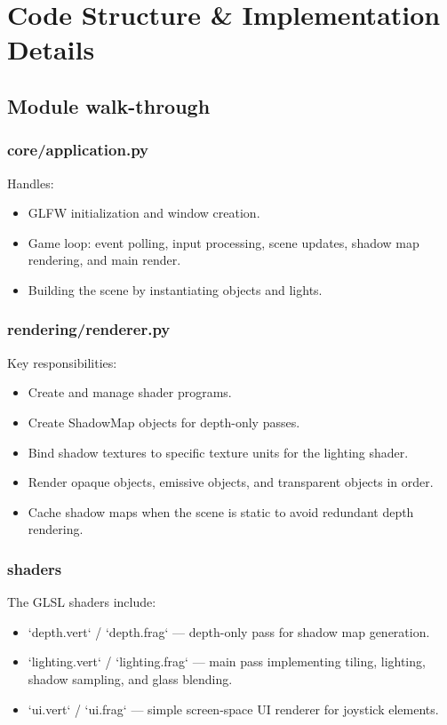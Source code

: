\documentclass[12pt,a4paper]{report}
\begin{document}
\chapter{Code Structure \& Implementation Details}

\section{Module walk-through}
\subsection{core/application.py}
Handles:
\begin{itemize}
  \item GLFW initialization and window creation.
  \item Game loop: event polling, input processing, scene updates, shadow map rendering, and main render.
  \item Building the scene by instantiating objects and lights.
\end{itemize}

\subsection{rendering/renderer.py}
Key responsibilities:
\begin{itemize}
  \item Create and manage shader programs.
  \item Create ShadowMap objects for depth-only passes.
  \item Bind shadow textures to specific texture units for the lighting shader.
  \item Render opaque objects, emissive objects, and transparent objects in order.
  \item Cache shadow maps when the scene is static to avoid redundant depth rendering.
\end{itemize}

\subsection{shaders}
The GLSL shaders include:
\begin{itemize}
  \item `depth.vert` / `depth.frag` — depth-only pass for shadow map generation.
  \item `lighting.vert` / `lighting.frag` — main pass implementing tiling, lighting, shadow sampling, and glass blending.
  \item `ui.vert` / `ui.frag` — simple screen-space UI renderer for joystick elements.
\end{itemize}
\end{document}
